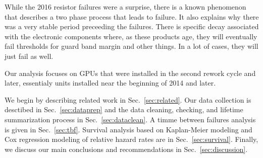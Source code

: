 While the 2016 resistor failures were a surprise, there is a known
phenomenon \cite{referenceneeded} that describes a two phase process
that leads to failure. It also explains why there was a very stable
period preceeding the failures. There is specific decay associated
with the electronic components where, as these products age, they will
eventually fail thresholds for guard band margin and other things. In
a lot of cases, they will just fail as well. 

Our analysis focuses on GPUs that were installed in the second rework
cycle and later, essentialy units installed near the beginning of 2014
and later.

We begin by describing related work in Sec.~\ref{sec:related}. Our
data collection is desctibed in Sec.~\ref{sec:dataprep} and the data
cleaning, checking, and lifetime summarization process in
Sec.~\ref{sec:dataclean}. A timme between failures analysis is given
in Sec.~\ref{sec:tbf}. Survival analysis based on Kaplan-Meier
modeling and Cox regression modeling of relative hazard rates are in
Sec.~\ref{sec:survival}. Finally, we discuss our main conclusions and
recommendations in Sec.~\ref{sec:discussion}.
 


